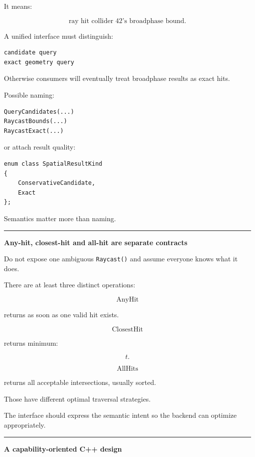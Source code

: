 It means:

\[
\text{ray hit collider 42's broadphase bound}.
\]

A unified interface must distinguish:

\begin{verbatim}
candidate query
exact geometry query
\end{verbatim}

Otherwise consumers will eventually treat broadphase results as exact hits.

Possible naming:

\begin{verbatim}
QueryCandidates(...)
RaycastBounds(...)
RaycastExact(...)
\end{verbatim}

or attach result quality:

\begin{verbatim}
enum class SpatialResultKind
{
    ConservativeCandidate,
    Exact
};
\end{verbatim}

Semantics matter more than naming.

\begin{center}\rule{0.5\linewidth}{0.5pt}\end{center}

\textbf{Any-hit, closest-hit and all-hit are separate contracts}

Do not expose one ambiguous \texttt{Raycast()} and assume everyone knows what it does.

There are at least three distinct operations:

\[
\text{AnyHit}
\]

returns as soon as one valid hit exists.

\[
\text{ClosestHit}
\]

returns minimum:

\[
t.
\]

\[
\text{AllHits}
\]

returns all acceptable intersections, usually sorted.

Those have different optimal traversal strategies.

The interface should express the semantic intent so the backend can optimize appropriately.

\begin{center}\rule{0.5\linewidth}{0.5pt}\end{center}

\textbf{A capability-oriented C++ design}

